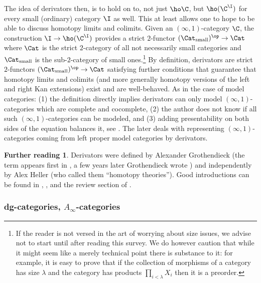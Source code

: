 \documentclass[12pt]{amsart}
\theoremstyle{definition} \newtheorem{definition}[theorem]{Definition}
\newtheorem*{further}{Further reading}
\numberwithin{equation}{section}
\newcommand{\oo}{\infty}
\newcommand{\io}{$(\oo,1)$}
\begin{document}
The idea of derivators then, is to hold on to, not just $\ho\C$, but
$\ho(\C^\I)$ for every small (ordinary) category $\I$ as well. This at
least allows one to hope to be able to discuss homotopy limits and
colimits. Given an \io-category $\C$, the construction $\I \to
\ho(\C^\I)$ provides a strict $2$-functor $(\Cat_\text{small})^{\op}
\to \Cat$ where $\Cat$ is the strict $2$-category of all not
necessarily small categories and $\Cat_\text{small}$ is the
sub-$2$-category of small ones.\footnote{If the reader is not versed
in the art of worrying about size issues, we advise not to start until
after reading this survey. We do however caution that while it might
seem like a merely technical point there is substance to it: for
example, it is easy to prove that if the collection of morphisms of a
category has size $\lambda$ and the category has products
$\prod_{i<\lambda} X_i$ then it is a preorder.} By definition,
derivators are strict $2$-functors $(\Cat_\text{small})^{\op} \to
\Cat$ satisfying further conditions that guarantee that homotopy
limits and colimits (and more generally homotopy versions of the left
and right Kan extensions) exist and are well-behaved. As in the case
of model categories: (1) the definition directly implies derivators
can only model \io-categories which are complete and cocomplete, (2)
the author does not know if all such \io-categories can be modeled,
and (3) adding presentability on both sides of the equation balances
it, see \cite{RenaudinPres}. The later \cite{RenaudinLP} deals with
representing \io-categories coming from left proper model categories
by derivators.

\begin{further} Derivators were defined by Alexander Grothendieck (the
term appears first in \cite{PursuingStacks}, a few years later
Grothendieck wrote \cite{Derivateurs}) and independently by Alex
Heller \cite{Heller} (who called them ``homotopy theories''). Good
introductions can be found in \cite{Maltsiniotis}, \cite{GrothDer}, and
the review section of \cite{ShulmanPontoGroth}. \end{further}

\subsubsection{dg-categories, $A_\oo$-categories}
\end{document}
